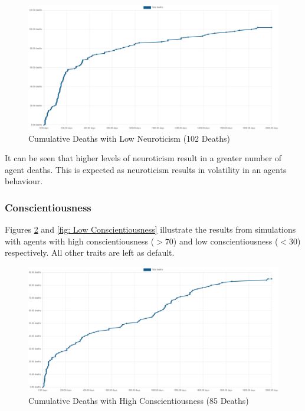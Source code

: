 \begin{figure}[H]
    \begin{center}
        \includegraphics[scale=0.25]{Images/Cumulative Deaths, With Treaties, T7Only, 2000days, 20food, Low Neur, 102deaths.png}
    \end{center}
    \caption{Cumulative Deaths with Low Neuroticism (102 Deaths)}
    \label{fig: Low Neuroticism}
\end{figure}

It can be seen that higher levels of neuroticism result in a greater number of agent deaths. This is expected as neuroticism results in volatility in an agents behaviour. 

\newpage
\subsubsection{Conscientiousness}
\label{subsubsec: Conscientiousness}

Figures \ref{fig: High Conscientiousness} and \ref{fig: Low Conscientiousness} illustrate the results from simulations with agents with high conscientiousness ($>$70) and low conscientiousness ($<$30) respectively. All other traits are left as default.

\begin{figure}[H]
    \begin{center}
        \includegraphics[scale=0.25]{Images/Cumulative Deaths, With Treaties, T7Only, 2000days, 20food, High Conscient, 85deaths.png}
    \end{center}
    \caption{Cumulative Deaths with High Conscientiousness (85 Deaths)}
    \label{fig: High Conscientiousness}
\end{figure}

